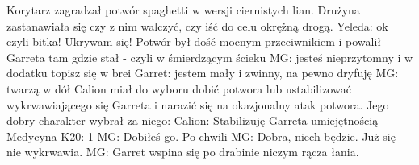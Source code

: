 \documentclass[10pt,twoside,twocolumn]{book}
\begin{document}
%       
Korytarz zagradzał potwór spaghetti w wersji ciernistych lian. Drużyna zastanawiała się czy z nim walczyć, czy iść do celu okrężną drogą.
Yeleda: ok czyli bitka! Ukrywam się!
%    
%       
Potwór był dość mocnym przeciwnikiem i powalił Garreta tam gdzie stał - czyli w śmierdzącym ścieku
MG: jesteś nieprzytomny i w dodatku topisz się w brei
Garret: jestem mały i zwinny, na pewno dryfuję
MG: twarzą w dół
%    
%       
Calion miał do wyboru dobić potwora lub ustabilizować wykrwawiającego się Garreta i narazić się na okazjonalny atak potwora. Jego dobry charakter wybrał za niego:
Calion: Stabilizuję Garreta umiejętnością
Medycyna K20: 1
MG: Dobiłeś go.
Po chwili
MG: Dobra, niech będzie. Już się nie wykrwawia.
%    
%       
MG: Garret wspina się po drabinie niczym rącza łania.
%    
\end{document}
